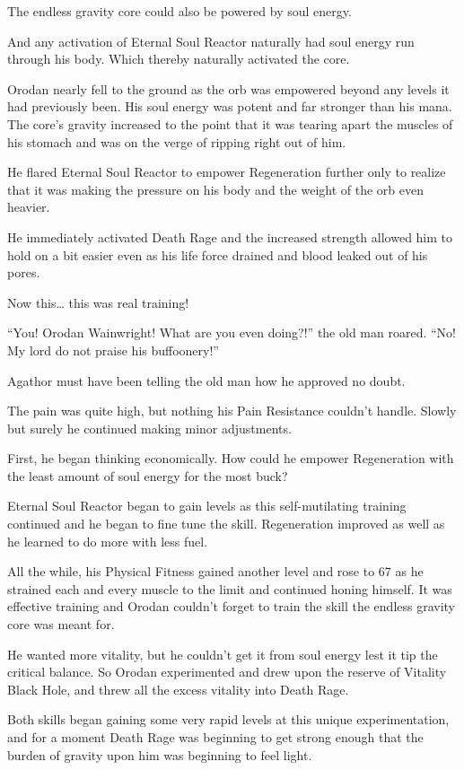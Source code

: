 \documentclass[a4paper,10pt]{book}
\begin{document}
The endless gravity core could also be powered by soul energy.\par
And any activation of Eternal Soul Reactor naturally had soul energy run through his body. Which thereby naturally activated the core.\par
Orodan nearly fell to the ground as the orb was empowered beyond any levels it had previously been. His soul energy was potent and far stronger than his mana. The core’s gravity increased to the point that it was tearing apart the muscles of his stomach and was on the verge of ripping right out of him.\par
He flared Eternal Soul Reactor to empower Regeneration further only to realize that it was making the pressure on his body and the weight of the orb even heavier.\par
He immediately activated Death Rage and the increased strength allowed him to hold on a bit easier even as his life force drained and blood leaked out of his pores.\par
Now this… this was real training!\par
“You! Orodan Wainwright! What are you even doing?!” the old man roared. “No! My lord do not praise his buffoonery!”\par
Agathor must have been telling the old man how he approved no doubt.\par
The pain was quite high, but nothing his Pain Resistance couldn’t handle. Slowly but surely he continued making minor adjustments.\par
First, he began thinking economically. How could he empower Regeneration with the least amount of soul energy for the most buck?\par
Eternal Soul Reactor began to gain levels as this self-mutilating training continued and he began to fine tune the skill. Regeneration improved as well as he learned to do more with less fuel.\par
All the while, his Physical Fitness gained another level and rose to 67 as he strained each and every muscle to the limit and continued honing himself. It was effective training and Orodan couldn’t forget to train the skill the endless gravity core was meant for.\par
He wanted more vitality, but he couldn’t get it from soul energy lest it tip the critical balance. So Orodan experimented and drew upon the reserve of Vitality Black Hole, and threw all the excess vitality into Death Rage.\par
Both skills began gaining some very rapid levels at this unique experimentation, and for a moment Death Rage was beginning to get strong enough that the burden of gravity upon him was beginning to feel light.\par
\end{document}
